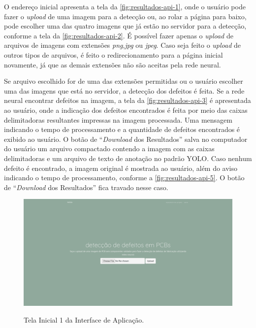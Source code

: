 O endereço inicial apresenta a tela da \autoref{fig:resultados-api-1}, onde o usuário pode fazer o \textit{upload} de uma imagem para a detecção ou, ao rolar a página para baixo, pode escolher uma das quatro imagens que já estão no servidor para a detecção, conforme a tela da \autoref{fig:resultados-api-2}. É possível fazer apenas o \textit{upload} de arquivos de imagens com extensões \textit{png},\textit{jpg} ou \textit{jpeg}. Caso seja feito o \textit{upload} de outros tipos de arquivos, é feito o redirecionamento para a página inicial novamente, já que as demais extensões não são aceitas pela rede neural.

Se arquivo escolhido for de uma das extensões permitidas ou o usuário escolher uma das imagens que está no servidor, a detecção dos defeitos é feita. Se a rede neural encontrar defeitos na imagem, a tela da \autoref{fig:resultados-api-3} é apresentada ao usuário, onde a indicação dos defeitos encontrados é feita por meio das caixas delimitadoras resultantes impressas na imagem processada. Uma mensagem indicando o tempo de processamento e a quantidade de defeitos encontrados é exibido ao usuário. O botão de ``\textit{Download} dos Resultados'' salva no computador do usuário um arquivo compactado contendo a imagem com as caixas delimitadoras e um arquivo de texto de anotação no padrão YOLO. Caso nenhum defeito é encontrado, a imagem original é mostrada ao usuário, além do aviso indicando o tempo de processamento, conforme a \autoref{fig:resultados-api-5}. O botão de ``\textit{Download} dos Resultados'' fica travado nesse caso.

\begin{landscape}
  \begin{figure}[H] %
    \centering
    \caption{Tela Inicial 1 da Interface de Aplicação.}
    \includegraphics[scale=0.36]{img/api/1.png}
    \label{fig:resultados-api-1}
  \end{figure}
\end{landscape}

